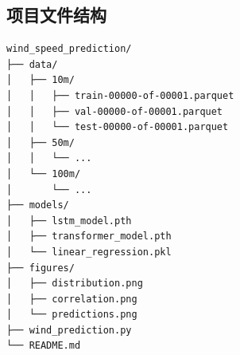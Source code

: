 \documentclass[12pt,a4paper]{article}
\begin{document}
\subsection*{项目文件结构}
\begin{lstlisting}
wind_speed_prediction/
├── data/
│   ├── 10m/
│   │   ├── train-00000-of-00001.parquet
│   │   ├── val-00000-of-00001.parquet
│   │   └── test-00000-of-00001.parquet
│   ├── 50m/
│   │   └── ...
│   └── 100m/
│       └── ...
├── models/
│   ├── lstm_model.pth
│   ├── transformer_model.pth
│   └── linear_regression.pkl
├── figures/
│   ├── distribution.png
│   ├── correlation.png
│   └── predictions.png
├── wind_prediction.py
└── README.md
\end{lstlisting}
\end{document}
